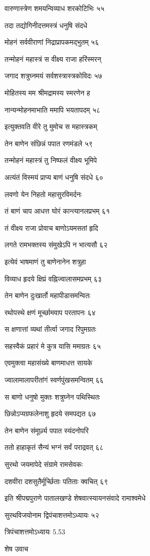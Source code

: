 वारुणास्त्रेण शमयन्विव्याध शरकोटिभिः ५५

तदा तद्योगिनीदत्तमस्त्रं धनुषि संदधे

मोहनं सर्ववीराणां निद्राप्रापकमद्भुतम् ५६

तन्मोहनं महास्त्रं स वीक्ष्य राजा हरिंस्मरन्

जगाद शत्रुघ्नमयं सर्वशस्त्रास्त्रकोविदः ५७

मोहितस्य मम श्रीमद्रामस्य स्मरणेन ह

नान्यन्मोहनमाभाति ममापि भयतापदम् ५८

इत्युक्तवति वीरे तु मुमोच स महास्त्रकम्

तेन बाणेन संछिन्नं पपात रणमंडले ५९

तन्मोहनं महास्त्रं तु निष्फलं वीक्ष्य भूमिपे

अत्यंतं विस्मयं प्राप्य बाणं धनुषि संदधे ६०

लवणो येन निहतो महासुरविमर्दनः

तं बाणं चाप आधत्त घोरं कान्त्यानलप्रभम् ६१

तं वीक्ष्य राजा प्रोवाच बाणोऽयमसतां हृदि

लगते रामभक्तस्य संमुखेऽपि न भात्यसौ ६२

इत्येवं भाषमाणं तु बाणेनानेन शत्रुहा

विव्याध हृदये क्षिप्रं वह्निज्वालासमप्रभम् ६३

तेन बाणेन दुःखार्तो महापीडासमन्वितः

रथोपस्थे क्षणं मूर्च्छामवाप परतापनः ६४

स क्षणात्तां व्यथां तीर्त्वा जगाद रिपुमग्रतः

सहस्वैकं प्रहारं मे कुत्र यासि ममाग्रतः ६५

एवमुक्त्वा महासंख्ये बाणमाधत्त सायके

ज्वालामालापरीतांगं स्वर्णपुंखसमन्वितम् ६६

स बाणो धनुषो मुक्तः शत्रुघ्नेन पथिस्थितः

छिन्नोऽप्यग्रफलेनाशु हृदये समपद्यत ६७

तेन बाणेन संमूर्छ्य पपात स्यंदनोपरि

ततो हाहाकृतं सैन्यं भग्नं सर्वं पराद्रवत् ६८

सुरथो जयमापेदे संग्रामे रामसेवकः

दशवीरा दशसुतैर्मूर्च्छिताः पतिताः क्वचित् ६९

इति श्रीपद्मपुराणे पातालखण्डे शेषवात्स्यायनसंवादे रामाश्वमेधे

सुरथविजयोनाम द्विपंचाशत्तमोऽध्यायः ५२

त्रिपंचाशत्तमोऽध्यायः 5.53

शेष उवाच

